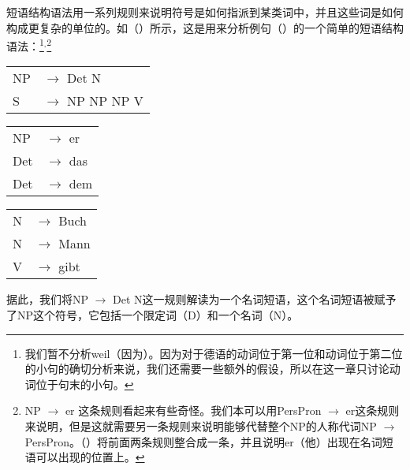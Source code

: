 短语结构语法用一系列规则来说明符号是如何指派到某类词中，并且这些词是如何构成更复杂的单位的。如（）所示，这是用来分析例句（）的一个简单的短语结构语法：\footnote{%
我们暂不分析weil（因为）。因为对于德语的动词位于第一位和动词位于第二位的小句的确切分析来说，我们还需要一些额外的假设，所以在这一章只讨论动词位于句末的小句。
}$^,$\footnote{\label{fn-np-pron-ps-rule}%
NP $\to$ er 这条规则看起来有些奇怪。我们本可以用PersPron $\to$ er这条规则来说明，但是这就需要另一条规则来说明能够代替整个NP的人称代词NP $\to$ PersPron。（）将前面两条规则整合成一条，并且说明er（他）出现在名词短语可以出现的位置上。
}

\ea
\label{bsp-grammatik-psg}
\begin{tabular}[t]{@{}l@{ }l}
{NP} & {$\to$ Det N}\\          
{S}  & {$\to$ NP NP NP V}
\end{tabular}\hspace{2cm}%
\begin{tabular}[t]{@{}l@{ }l}
{NP} & {$\to$ er}\\
{Det}  & {$\to$ das}\\
{Det}  & {$\to$ dem}\\
\end{tabular}\hspace{8mm}
\begin{tabular}[t]{@{}l@{ }l}
{N} & {$\to$ Buch}\\
{N} & {$\to$ Mann}\\
{V} & {$\to$ gibt}\\
\end{tabular}
\z
据此，我们将NP $\to$\isce{$\to$}{$\to$} Det N这一规则解读为一个名词短语，这个名词短语被赋予了NP这个符号，它包括一个限定词（D）和一个名词（N）。

